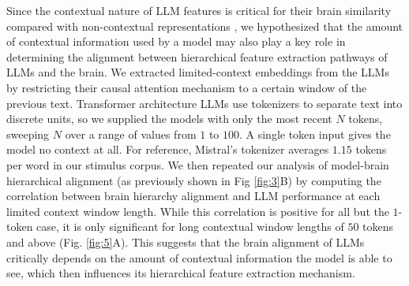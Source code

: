 Since the contextual nature of LLM features is critical for their brain similarity compared with non-contextual representations \cite{goldstein2022shared, schrimpf2021neural, caucheteux2022deep}, we hypothesized that the amount of contextual information used by a model may also play a key role in determining the alignment between hierarchical feature extraction pathways of LLMs and the brain. We extracted limited-context embeddings from the LLMs by restricting their causal attention mechanism to a certain window of the previous text. Transformer architecture LLMs use tokenizers to separate text into discrete units, so we supplied the models with only the most recent $N$ tokens, sweeping $N$ over a range of values from $1$ to $100$. A single token input gives the model no context at all. For reference, Mistral's tokenizer averages $1.15$ tokens per word in our stimulus corpus. We then repeated our analysis of model-brain hierarchical alignment (as previously shown in Fig \ref{fig:3}B) by computing the correlation between brain hierarchy alignment and LLM performance at each limited context window length. While this correlation is positive for all but the $1$-token case, it is only significant for long contextual window lengths of $50$ tokens and above (Fig. \ref{fig:5}A). This suggests that the brain alignment of LLMs critically depends on the amount of contextual information the model is able to see, which then influences its hierarchical feature extraction mechanism.

